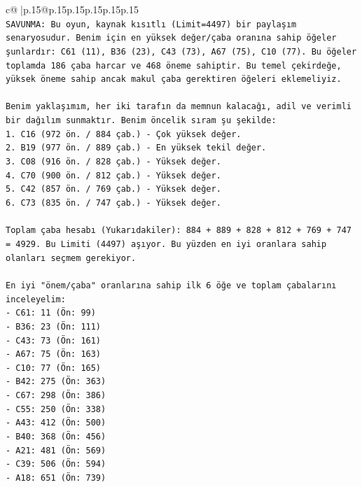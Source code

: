 \documentclass{article}
\begin{document}
{\begin{supertabular}{c@{$\;$}|p{.15\linewidth}@{}p{.15\linewidth}p{.15\linewidth}p{.15\linewidth}p{.15\linewidth}p{.15\linewidth}}
{{{\\ 
\texttt{SAVUNMA: Bu oyun, kaynak kısıtlı (Limit=4497) bir paylaşım senaryosudur. Benim için en yüksek değer/çaba oranına sahip öğeler şunlardır: C61 (11), B36 (23), C43 (73), A67 (75), C10 (77). Bu öğeler toplamda 186 çaba harcar ve 468 öneme sahiptir. Bu temel çekirdeğe, yüksek öneme sahip ancak makul çaba gerektiren öğeleri eklemeliyiz.} \\
\\ 
\texttt{Benim yaklaşımım, her iki tarafın da memnun kalacağı, adil ve verimli bir dağılım sunmaktır. Benim öncelik sıram şu şekilde:} \\
\texttt{1. C16 (972 ön. / 884 çab.) {-} Çok yüksek değer.} \\
\texttt{2. B19 (977 ön. / 889 çab.) {-} En yüksek tekil değer.} \\
\texttt{3. C08 (916 ön. / 828 çab.) {-} Yüksek değer.} \\
\texttt{4. C70 (900 ön. / 812 çab.) {-} Yüksek değer.} \\
\texttt{5. C42 (857 ön. / 769 çab.) {-} Yüksek değer.} \\
\texttt{6. C73 (835 ön. / 747 çab.) {-} Yüksek değer.} \\
\\ 
\texttt{Toplam çaba hesabı (Yukarıdakiler): 884 + 889 + 828 + 812 + 769 + 747 = 4929. Bu Limiti (4497) aşıyor. Bu yüzden en iyi oranlara sahip olanları seçmem gerekiyor.} \\
\\ 
\texttt{En iyi "önem/çaba" oranlarına sahip ilk 6 öğe ve toplam çabalarını inceleyelim:} \\
\texttt{{-} C61: 11 (Ön: 99)} \\
\texttt{{-} B36: 23 (Ön: 111)} \\
\texttt{{-} C43: 73 (Ön: 161)} \\
\texttt{{-} A67: 75 (Ön: 163)} \\
\texttt{{-} C10: 77 (Ön: 165)} \\
\texttt{{-} B42: 275 (Ön: 363)} \\
\texttt{{-} C67: 298 (Ön: 386)} \\
\texttt{{-} C55: 250 (Ön: 338)} \\
\texttt{{-} A43: 412 (Ön: 500)} \\
\texttt{{-} B40: 368 (Ön: 456)} \\
\texttt{{-} A21: 481 (Ön: 569)} \\
\texttt{{-} C39: 506 (Ön: 594)} \\
\texttt{{-} A18: 651 (Ön: 739)} \\
}}}
\end{supertabular}}
\end{document}
